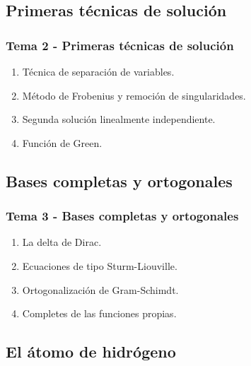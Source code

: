 \documentclass[12pt]{beamer}
\begin{document}
\subsection{Primeras técnicas de solución}

\begin{frame}
\frametitle{Tema 2 - Primeras técnicas de solución}
\begin{enumerate}[<+->]
\item Técnica de separación de variables.
\item Método de Frobenius y remoción de singularidades.
\item Segunda solución linealmente independiente.
\item Función de Green.
\end{enumerate}
\end{frame}

\subsection{Bases completas y ortogonales}

\begin{frame}
\frametitle{Tema 3 - Bases completas y ortogonales}
\begin{enumerate}[<+->]
\item La delta de Dirac. 
\item Ecuaciones de tipo Sturm-Liouville.
\item Ortogonalización de Gram-Schimdt.
\item Completes de las funciones propias.
\end{enumerate}
\end{frame}

\subsection{El átomo de hidrógeno}
\end{document}
